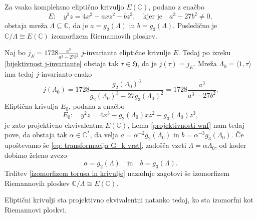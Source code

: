 \documentclass[mat1]{fmfdelo}
\numberwithin{equation}{section}
\newcommand{\C}{\mathbb C}
\newcommand{\HH}{\mathfrak{H}}
\newcommand{\CM}{\mathbb C ^*}
\newcommand{\torus}{\C/\Lambda}
\newcommand{\iso}{\cong}
\newcommand{\oz}{oz.\ }
\theoremstyle{definition}
\begin{document}

\begin{izrek}[Uniformizacija]
    \label{uniformizacija}
    Za vsako kompleksno eliptično krivuljo $E(\C)$, podano z enačbo
    \[
        E: \quad y^2z = 4x^3 - axz^2 - bz^3, \quad \text{kjer je} \quad a^3 - 27b^2 \neq 0,  
    \]
    obstaja mreža $\Lambda \subseteq \C$, da je $a = g_2(\Lambda)$ in $b = g_3(\Lambda)$. Posledično je $\torus \cong E(\C)$ izomorfizem Riemannovih ploskev. 
\end{izrek}

\begin{dokaz}
    Naj bo $j_E = 1728\frac{a^3}{a^3 - 27b^2}$ $j$-invarianta eliptične krivulje $E$. Tedaj po izreku \ref{bijektivnost j-invariante} obstaja tak $\tau \in \HH$, da je $j(\tau) = j_E$. Mreža $\Lambda_0 = \langle 1, \tau \rangle$ ima tedaj $j$-invarianto enako
    \[
        j(\Lambda_0) = 1728\frac{g_2(\Lambda_0)^3}{g_2(\Lambda_0)^3 - 27g_3(\Lambda_0)^2} = 1728\frac{a^3}{a^3 - 27b^2}.  
    \]
    Eliptična krivulja $E_0$, podana z enačbo
    \[
        E_0: \quad y^2z = 4x^3 - g_2(\Lambda_0)xz^2 - g_3(\Lambda_0)z^3, 
    \]
    je zato projektivno ekvivalentna $E(\C)$, Lema \ref{projektivnosti wnf} nam tedaj pove, da obstaja tak $\alpha \in \CM$, da velja $a = \alpha^{-2}g_2(\Lambda_0)$ in $b = \alpha^{-3}g_3(\Lambda_0)$. Če upoštevamo še \eqref{eq: transformacija G_k vrst}, zadošča vzeti $\Lambda = \alpha\Lambda_0$, od koder dobimo želeno zvezo
    \[
        a = g_2(\Lambda) \quad \text{in} \quad b = g_3(\Lambda).  
    \]
    Trditev \ref{izomorfizem torusa in krivulje} nazadnje zagotovi še izomorfizem Riemannovih ploskev $\torus \iso E(\C)$.
\end{dokaz}

\begin{posledica}
    Eliptični krivulji sta projektivno ekvivalentni natanko tedaj, ko sta izomorfni kot Riemannovi ploskvi.
\end{posledica}
\end{document}
